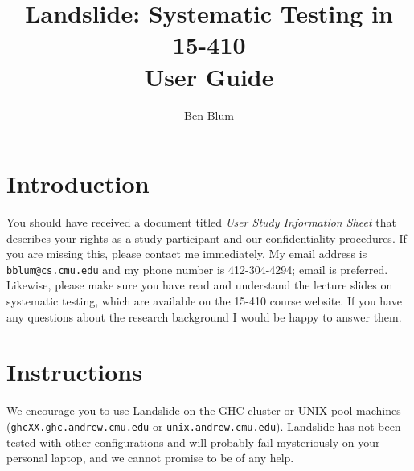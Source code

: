 \documentclass{article}
\begin{document}

\title{\bf Landslide: Systematic Testing in 15-410 \\ User Guide
}
\author{Ben Blum}
\date{}
\maketitle

\section{Introduction}

%

\noindent You should have received a document titled {\em User Study Information Sheet} that describes your rights as a study participant and our confidentiality procedures. If you are missing this, please contact me immediately. My email address is {\tt bblum@cs.cmu.edu} and my phone number is 412-304-4294; email is preferred.
\\

\noindent Likewise, please make sure you have read and understand the lecture slides on systematic testing, which are available on the 15-410 course website. If you have any questions about the research background I would be happy to answer them.

\section{Instructions}


\noindent We encourage you to use Landslide on the GHC cluster or UNIX pool machines ({\tt ghcXX.ghc.andrew.cmu.edu} or {\tt unix.andrew.cmu.edu}). Landslide has not been tested with other configurations and will probably fail mysteriously on your personal laptop, and we cannot promise to be of any help.
\end{document}
